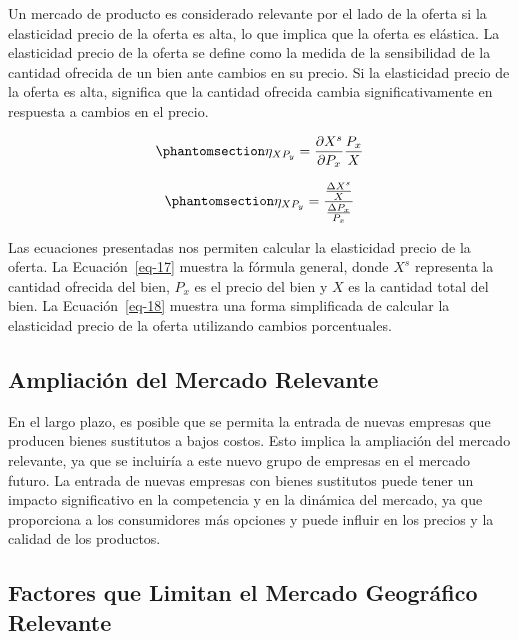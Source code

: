 \documentclass[
  doc,
  floatsintext,
  longtable,
  a4paper,
  nolmodern,
  notxfonts,
  notimes,
  12pt,
  colorlinks=true,linkcolor=blue,citecolor=blue,urlcolor=blue]{apa7}
\begin{document}
Un mercado de producto es considerado relevante por el lado de la oferta
si la elasticidad precio de la oferta es alta, lo que implica que la
oferta es elástica. La elasticidad precio de la oferta se define como la
medida de la sensibilidad de la cantidad ofrecida de un bien ante
cambios en su precio. Si la elasticidad precio de la oferta es alta,
significa que la cantidad ofrecida cambia significativamente en
respuesta a cambios en el precio.

\begin{equation}\protect\phantomsection\label{eq-17}{
\eta_{XP_{y}} = \frac{\partial X^s}{\partial P_{x}} \frac{P_{x}}{X}
}\end{equation}

\begin{equation}\protect\phantomsection\label{eq-18}{
\eta_{XP_{y}} = \frac{\frac{\Delta X^s}{X}}{\frac{\Delta P_{x}}{P_{x}}}
}\end{equation}

Las ecuaciones presentadas nos permiten calcular la elasticidad precio
de la oferta. La Ecuación~\ref{eq-17} muestra la fórmula general, donde
\(X^s\) representa la cantidad ofrecida del bien, \(P_x\) es el precio
del bien y \(X\) es la cantidad total del bien. La Ecuación~\ref{eq-18}
muestra una forma simplificada de calcular la elasticidad precio de la
oferta utilizando cambios porcentuales.

\subsection{Ampliación del Mercado
Relevante}\label{ampliaciuxf3n-del-mercado-relevante}

En el largo plazo, es posible que se permita la entrada de nuevas
empresas que producen bienes sustitutos a bajos costos. Esto implica la
ampliación del mercado relevante, ya que se incluiría a este nuevo grupo
de empresas en el mercado futuro. La entrada de nuevas empresas con
bienes sustitutos puede tener un impacto significativo en la competencia
y en la dinámica del mercado, ya que proporciona a los consumidores más
opciones y puede influir en los precios y la calidad de los productos.

\subsection{Factores que Limitan el Mercado Geográfico
Relevante}\label{factores-que-limitan-el-mercado-geogruxe1fico-relevante}
\end{document}
